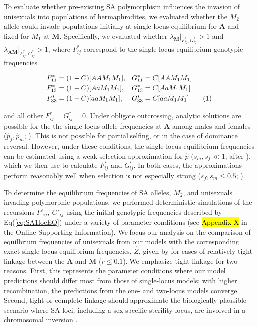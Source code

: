 \documentclass[9pt,twocolumn,twoside,lineno]{gsajnl}
\newcommand\numberthis{\addtocounter{equation}{1}\tag{\theequation}}
\begin{document}
To evaluate whether pre-existing SA polymorphism influences the invasion of unisexuals into populations of hermaphrodites, we evaluated whether the $M_2$ allele could invade populations initially at single-locus equilibrium for $\mathbf{A}$ and fixed for $M_1$ at $\mathbf{M}$. Specifically, we evaluated whether $\lambda_\mathbf{M} \rvert_{F^{\ast}_{ij},G^{\ast}_{ij}} > 1$ and $\lambda_\mathbf{AM} \rvert_{F^{\ast}_{ij},G^{\ast}_{ij}} > 1$, where $F^{\ast}_{ij}$ correspond to the single-locus equilibrium genotypic frequencies
\begin{linenomath}\begin{align*} \label{eq:SA1locEQ}
	F^{\ast}_{11} &= (1 - C)[AAM_1M_1],& G^{\ast}_{11} &= C[AAM_1M_1]  \\
	F^{\ast}_{13} &= (1 - C)[AaM_1M_1],& G^{\ast}_{13} &= C[AaM_1M_1] \\
	F^{\ast}_{33} &= (1 - C)[aaM_1M_1],& G^{\ast}_{33} &= C[aaM_1M_1] \numberthis \\
\end{align*}\end{linenomath}

\noindent and all other $F^{\ast}_{ij} = G^{\ast}_{ij} =0$. Under obligate outcrossing, analytic solutions are possible for the the single-locus allele frequencies at $\mathbf{A}$ among males and females ($\hat{p}_f,\hat{p}_m$; \citealt{Kidwell1977}). This is not possible for partial selfing, or in the case of dominance reversal. However, under these conditions, the single-locus equilibrium frequencies can be estimated using a weak selection approximation for $\hat{p}$ ($s_m,s_f \ll 1$; after \citealt{JordanConnallon2014}), which we then use to calculate $F^{\ast}_{ij}$ and $G^{\ast}_{ij}$. In both cases, the approximations perform reasonably well when selection is not especially strong ($s_f,s_m \leq 0.5$; \citealt{JordanConnallon2014,Olito2017}). 

To determine the equilibrium frequencies of SA alleles, $M_2$, and unisexuals invading polymorphic populations, we performed deterministic simulations of the recursions $F'_{ij},~G'_{ij}$ using the initial genotypic frequencies described by Eq(\ref{eq:SA1locEQ}) under a variety of parameter conditions (see \hl{Appendix X} in the Online Supporting Information). We focus our analysis on the comparison of equilbrium frequencies of unisexuals from our models with the corresponding exact single-locus equilibrium frequencies, $\hat{Z}$, given by \citet{Charlesworth1978a} for cases of relatively tight linkage between the $\mathbf{A}$ and $\mathbf{M}$ ($r\leq 0.1$). We emphasize tight linkage for two reasons. First, this represents the parameter conditions where our model predictions should differ most from those of single-locus models; with higher recombination, the predictions from the one- and two-locus models converge. Second, tight or complete linkage should approximate the biologically plausible scenario where SA loci, including a sex-specific sterility locus, are involved in a chromosomal inversion \citep{LeeKelly2015}.
\end{document}
